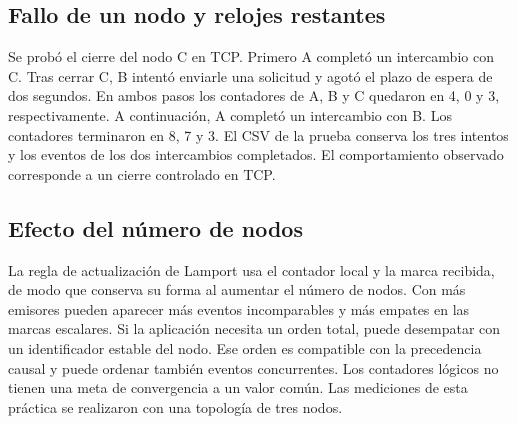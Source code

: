 \subsection{Fallo de un nodo y relojes restantes}
Se probó el cierre del nodo C en TCP. Primero A completó un intercambio con C. Tras cerrar C, B intentó enviarle una solicitud y agotó el plazo de espera de dos segundos. En ambos pasos los contadores de A, B y C quedaron en 4, 0 y 3, respectivamente. A continuación, A completó un intercambio con B. Los contadores terminaron en 8, 7 y 3. El CSV de la prueba conserva los tres intentos y los eventos de los dos intercambios completados. El comportamiento observado corresponde a un cierre controlado en TCP.

\subsection{Efecto del número de nodos}
La regla de actualización de Lamport usa el contador local y la marca recibida, de modo que conserva su forma al aumentar el número de nodos. Con más emisores pueden aparecer más eventos incomparables y más empates en las marcas escalares. Si la aplicación necesita un orden total, puede desempatar con un identificador estable del nodo. Ese orden es compatible con la precedencia causal y puede ordenar también eventos concurrentes. Los contadores lógicos no tienen una meta de convergencia a un valor común. Las mediciones de esta práctica se realizaron con una topología de tres nodos.
